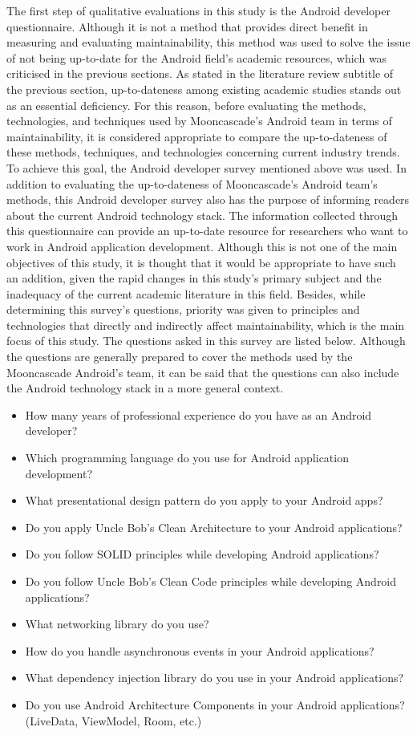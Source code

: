 The first step of qualitative evaluations in this study is the Android developer questionnaire. Although it is not a method that provides direct benefit in measuring and evaluating maintainability, this method was used to solve the issue of not being up-to-date for the Android field's academic resources, which was criticised in the previous sections. As stated in the literature review subtitle of the previous section, up-to-dateness among existing academic studies stands out as an essential deficiency. For this reason, before evaluating the methods, technologies, and techniques used by Mooncascade’s Android team in terms of maintainability, it is considered appropriate to compare the up-to-dateness of these methods, techniques, and technologies concerning current industry trends. To achieve this goal, the Android developer survey mentioned above was used. In addition to evaluating the up-to-dateness of Mooncascade's Android team’s methods, this Android developer survey also has the purpose of informing readers about the current Android technology stack. The information collected through this questionnaire can provide an up-to-date resource for researchers who want to work in Android application development. Although this is not one of the main objectives of this study, it is thought that it would be appropriate to have such an addition, given the rapid changes in this study's primary subject and the inadequacy of the current academic literature in this field. Besides, while determining this survey's questions, priority was given to principles and technologies that directly and indirectly affect maintainability, which is the main focus of this study. The questions asked in this survey are listed below. Although the questions are generally prepared to cover the methods used by the Mooncascade Android's team, it can be said that the questions can also include the Android technology stack in a more general context. 
\begin{itemize}
    \item How many years of professional experience do you have as an Android developer?
    \item Which programming language do you use for Android application development?
    \item What presentational design pattern do you apply to your Android apps?
    \item Do you apply Uncle Bob's Clean Architecture to your Android applications?
    \item Do you follow SOLID principles while developing Android applications?
    \item Do you follow Uncle Bob's Clean Code principles while developing Android applications?
    \item What networking library do you use?
    \item How do you handle asynchronous events in your Android applications?
    \item What dependency injection library do you use in your Android applications?
    \item Do you use Android Architecture Components in your Android applications? (LiveData, ViewModel, Room, etc.)
\end{itemize}

